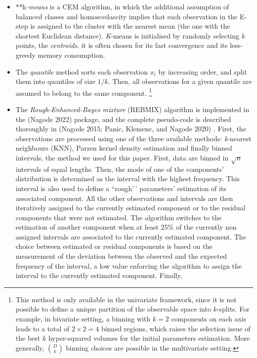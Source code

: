 \begin{itemize}
\item
  **k\emph{-means} is a CEM algorithm, in which the additional assumption of
  balanced classes and homoscedascity implies that each observation in
  the E-step is assigned to the cluster with the nearest mean (the one
  with the shortest Euclidean distance). \emph{K}-means is initialised by
  randomly selecting \(k\) points, the \emph{centroids}. it is often chosen
  for its fast convergence and its less-greedy memory consumption.
\item
  The \emph{quantile} method sorts each observation \(x_i\) by increasing
  order, and split them into quantiles of size \(1/k\). Then, all
  observations for a given quantile are assumed to belong to the same
  component. \footnote{This method is only available in the univariate framework,
  since it is not possible to define a unique partition of the observable space into $k$-splits. For example, in bivariate setting, a binning with $k=2$ components on each axis leads to a total of $2 \times 2=4$ binned regions, which raises the selection issue of the best $k$ hyper-squared volumes for the initial parameters estimation. More generally, $\binom{D}{k}$ binning choices are possible in the multivariate setting.}
\item
  The \emph{Rough-Enhanced-Bayes mixture} (REBMIX) algorithm is implemented
  in the  (Nagode 2022) package, and the complete
  pseudo-code is described thoroughly in (Nagode 2015; Panic, Klemenc, and Nagode 2020) . First, the
  observations are processed using one of the three available methods:
  \emph{k}-nearest neighbours (KNN), Parzen kernel density estimation and finally
  binned intervals, the method we used for this paper. First, data are
  binned in \(\sqrt{n}\) intervals of equal lengths. Then, the mode of
  one of the components' distribution is determined as the interval
  with the highest frequency. This interval is also used to define a
  ``rough'\,' parameters' estimation of its associated component. All the
  other observations and intervals are then iteratively assigned to
  the currently estimated component or to the residual components that
  were not estimated. The algorithm switches to the estimation of
  another component when at least \(25\%\) of the currently non
  assigned intervals are associated to the currently estimated
  component.
  The choice between estimated or residual components is based on the
  measurement of the deviation between the observed and the expected
  frequency of the interval, a low value enforcing the algorithm to
  assign the interval to the currently estimated component. Finally,

\end{itemize}

